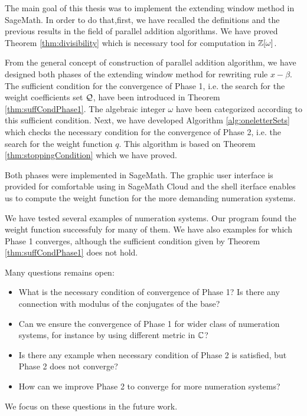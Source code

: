 The main goal of this thesis was to implement the extending window method in SageMath. In order to do that,first, we have recalled the definitions and the previous results in the field of parallel addition algorithms. We have proved Theorem \ref{thm:divisibility} which is necessary tool for computation in $\mathbb{Z}[\omega]$.

From the general concept of construction of parallel addition algorithm, we have designed both phases of the extending window method for rewriting rule $x-\beta$. The sufficient condition for the convergence of Phase 1, i.e. the search for the weight coefficients set $\mathcal{Q}$, have been introduced in Theorem \ref{thm:suffCondPhase1}. The algebraic integer $\omega$ have been categorized according to this sufficient condition. Next, we have developed Algorithm \ref{alg:oneletterSets} which checks the necessary condition for the convergence of Phase 2, i.e. the search for the weight function $q$. This algorithm is based on Theorem \ref{thm:stoppingCondition} which we have proved.

Both phases were implemented in SageMath. The graphic user interface is provided for comfortable using in SageMath Cloud and the shell iterface enables us to compute the weight function for the more demanding numeration systems.

We have tested several examples of numeration systems. Our program found the weight function successfuly for many of them. We have also examples for which Phase 1 converges, although the sufficient condition given by Theorem \ref{thm:suffCondPhase1} does not hold. 

Many questions remains open:
\begin{itemize}
\item What is the necessary condition of convergence of Phase 1? Is there any connection with modulus of the conjugates of the base?
\item Can we ensure the convergence of Phase 1 for wider class of numeration systems, for instance by using different metric in $\mathbb{C}$?
\item Is there any example when necessary condition of Phase 2 is satisfied, but Phase 2 does not converge?
\item How can we improve Phase 2 to converge for more numeration systems?
\end{itemize}
We focus on these questions in the future work.